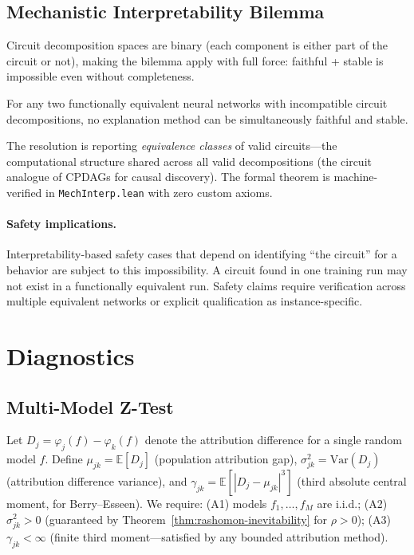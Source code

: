 \documentclass{jmlr}
\newcommand{\E}{\mathbb{E}}
\newcommand{\Var}{\mathrm{Var}}
\begin{document}
\subsection{Mechanistic Interpretability Bilemma}
\label{sec:mech-interp}

Circuit decomposition spaces are binary (each component is either part of the circuit or not), making the bilemma apply with full force: faithful + stable is impossible even without completeness.

\begin{theorem}\label{thm:mech-interp}
For any two functionally equivalent neural networks with incompatible circuit decompositions, no explanation method can be simultaneously faithful and stable.
\end{theorem}

\noindent The resolution is reporting \emph{equivalence classes} of valid circuits---the computational structure shared across all valid decompositions (the circuit analogue of CPDAGs for causal discovery). The formal theorem is machine-verified in \texttt{MechInterp.lean} with zero custom axioms.

\paragraph{Safety implications.}
Interpretability-based safety cases that depend on identifying ``the circuit'' for a behavior are subject to this impossibility. A circuit found in one training run may not exist in a functionally equivalent run. Safety claims require verification across multiple equivalent networks or explicit qualification as instance-specific.


\section{Diagnostics}
\label{sec:diagnostics}

\subsection{Multi-Model Z-Test}
\label{sec:f1}

Let $D_j = \varphi_j(f) - \varphi_k(f)$ denote the attribution difference for a single random model $f$. Define $\mu_{jk} = \E[D_j]$ (population attribution gap), $\sigma_{jk}^2 = \Var(D_j)$ (attribution difference variance), and $\gamma_{jk} = \E[|D_j - \mu_{jk}|^3]$ (third absolute central moment, for Berry--Esseen). We require: (A1) models $f_1, \ldots, f_M$ are i.i.d.; (A2) $\sigma_{jk}^2 > 0$ (guaranteed by Theorem~\ref{thm:rashomon-inevitability} for $\rho > 0$); (A3) $\gamma_{jk} < \infty$ (finite third moment---satisfied by any bounded attribution method).
\end{document}
